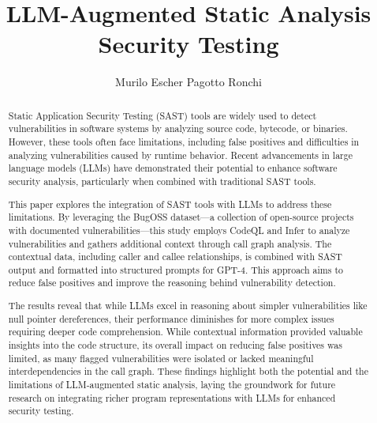 \documentclass[runningheads]{llncs}
\begin{document}
%
\title{LLM-Augmented Static Analysis Security Testing}
%
%
%
\author{Murilo Escher Pagotto Ronchi}
%
\maketitle %
%
%
\begin{abstract}
Static Application Security Testing (SAST) tools are widely used to detect vulnerabilities in software systems by analyzing source code, bytecode, or binaries. However, these tools often face limitations, including false positives and difficulties in analyzing vulnerabilities caused by runtime behavior. Recent advancements in large language models (LLMs) have demonstrated their potential to enhance software security analysis, particularly when combined with traditional SAST tools.

This paper explores the integration of SAST tools with LLMs to address these limitations. By leveraging the BugOSS dataset—a collection of open-source projects with documented vulnerabilities—this study employs CodeQL and Infer to analyze vulnerabilities and gathers additional context through call graph analysis. The contextual data, including caller and callee relationships, is combined with SAST output and formatted into structured prompts for GPT-4. This approach aims to reduce false positives and improve the reasoning behind vulnerability detection.

The results reveal that while LLMs excel in reasoning about simpler vulnerabilities like null pointer dereferences, their performance diminishes for more complex issues requiring deeper code comprehension. While contextual information provided valuable insights into the code structure, its overall impact on reducing false positives was limited, as many flagged vulnerabilities were isolated or lacked meaningful interdependencies in the call graph. These findings highlight both the potential and the limitations of LLM-augmented static analysis, laying the groundwork for future research on integrating richer program representations with LLMs for enhanced security testing.

\end{abstract}
%
%






%
%
\appendix
% 
%
%


%
\end{document}
